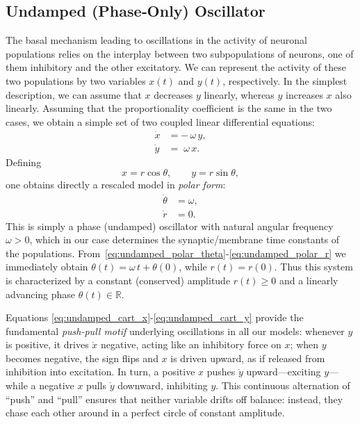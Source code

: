 \documentclass[12pt]{article}
\numberwithin{equation}{section}
\newcommand{\rev}[1]{\begingroup\color{navyblue}#1\endgroup}
\begin{document}
\subsection{Undamped (Phase‐Only) Oscillator}

The basal mechanism leading to oscillations in the activity of neuronal populations relies on the interplay between two subpopulations of neurons, one of them inhibitory and the other excitatory.
We can represent the activity of these two populations by two variables $x(t)$ and $y(t)$, respectively.
In the simplest description, we can assume that $x$ decreases $y$ linearly, whereas $y$ increases $x$ also linearly.
Assuming that the proportionality coefficient is the same in the two cases, we obtain a simple set of two coupled linear differential equations:
\begin{align}
    \dot{x} &= -\,\omega\,y,
    \label{eq:undamped_cart_x}\\
    \dot{y} &= \;\omega\,x.
    \label{eq:undamped_cart_y}
\end{align}
Defining
\begin{equation}
    x = r \cos\theta,\qquad
    y = r \sin\theta,
    \label{eq:undamped_xy_def}
\end{equation}
one obtains directly a rescaled model in \textit{polar form}:
\begin{align}
    \dot{\theta} &= \omega, 
    \label{eq:undamped_polar_theta}\\
    \dot{r}      &= 0.
    \label{eq:undamped_polar_r}
\end{align}
This is simply a phase (undamped) oscillator with natural angular frequency $\omega>0$, which in our case determines the synaptic/membrane time constants of the populations.
From~\eqref{eq:undamped_polar_theta}-\eqref{eq:undamped_polar_r} we immediately obtain $\theta(t) = \omega\,t + \theta(0)$, while $r(t) = r(0)$. Thus this \rev{system} is characterized by a constant \rev{(conserved)} amplitude $r(t)\ge0$ and a linearly advancing phase
$\theta(t)\in\mathbb{R}$.  

  Equations \eqref{eq:undamped_cart_x}-\eqref{eq:undamped_cart_y} provide the fundamental \textit{push-pull motif} underlying oscillations in all our models: whenever \(y\) is positive, it drives \(\dot{x}\) negative, acting like an inhibitory force on \(x\); when \(y\) becomes negative, the sign flips and \(x\) is driven upward, as if released from inhibition into excitation.  In turn, a positive \(x\) pushes \(\dot{y}\) upward—exciting \(y\)—while a negative \(x\) pulls \(\dot{y}\) downward, inhibiting \(y\).  This continuous alternation of “push” and “pull” ensures that neither variable drifts off balance: instead, they chase each other around in a perfect circle of constant amplitude.
\end{document}
